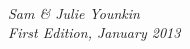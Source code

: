 \begin{titlepage}
\vspace*{1.5in}
\begin{center}
\\
\vspace*{0.5in}
\LARGE{\slshape Sam \& Julie Younkin}\\
\vspace*{0.5in}
\Large{\itshape First Edition, January 2013}




\end{center}

\end{titlepage}
